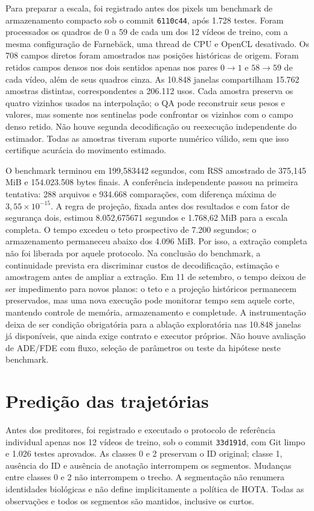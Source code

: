 Para preparar a escala, foi registrado antes dos pixels um benchmark de
armazenamento compacto sob o commit \texttt{6110c44}, após 1.728 testes.
Foram processados os quadros de 0 a 59 de cada um dos 12 vídeos de treino,
com a mesma configuração de Farnebäck, uma thread de CPU e OpenCL desativado.
Os 708 campos diretos foram amostrados nas posições históricas de origem.
Foram retidos campos densos nos dois sentidos apenas nos pares $0\to1$ e
$58\to59$ de cada vídeo, além de seus quadros cinza. As 10.848 janelas
compartilham 15.762 amostras distintas, correspondentes a 206.112 usos.
Cada amostra preserva os quatro vizinhos usados na interpolação; o QA pode
reconstruir seus pesos e valores, mas somente nos sentinelas pode confrontar
os vizinhos com o campo denso retido. Não houve segunda decodificação ou
reexecução independente do estimador. Todas as amostras tiveram suporte
numérico válido, sem que isso certifique acurácia do movimento estimado.

O benchmark terminou em 199,583442 segundos, com RSS amostrado de 375,145 MiB
e 154.023.508 bytes finais. A conferência independente passou na primeira
tentativa: 288 arquivos e 934.668 comparações, com diferença máxima de
$3{,}55\times10^{-15}$. A regra de projeção, fixada antes dos resultados e
com fator de segurança dois, estimou 8.052,675671 segundos e 1.768,62 MiB para
a escala completa. O tempo excedeu o teto prospectivo de 7.200 segundos;
o armazenamento permaneceu abaixo dos 4.096 MiB. Por isso, a extração completa
não foi liberada por aquele protocolo. Na conclusão do benchmark, a continuidade
prevista era discriminar custos de decodificação, estimação e amostragem antes
de ampliar a extração. Em 11 de setembro, o tempo deixou de ser impedimento
para novos planos: o teto e a projeção históricos permanecem preservados, mas
uma nova execução pode monitorar tempo sem aquele corte, mantendo controle de
memória, armazenamento e completude. A instrumentação deixa de ser condição
obrigatória para a ablação exploratória nas 10.848 janelas já disponíveis,
que ainda exige contrato e executor próprios. Não houve avaliação de ADE/FDE
com fluxo, seleção de parâmetros ou teste da hipótese neste benchmark.

\section{Predição das trajetórias}

Antes dos preditores, foi registrado e executado o protocolo de referência individual apenas nos 12 vídeos de treino, sob o commit \texttt{33d191d}, com Git limpo e 1.026 testes aprovados. As classes 0 e 2 preservam o ID original; classe 1, ausência do ID e ausência de anotação interrompem os segmentos. Mudanças entre classes 0 e 2 não interrompem o trecho. A segmentação não renumera identidades biológicas e não define implicitamente a política de HOTA. Todas as observações e todos os segmentos são mantidos, inclusive os curtos.

